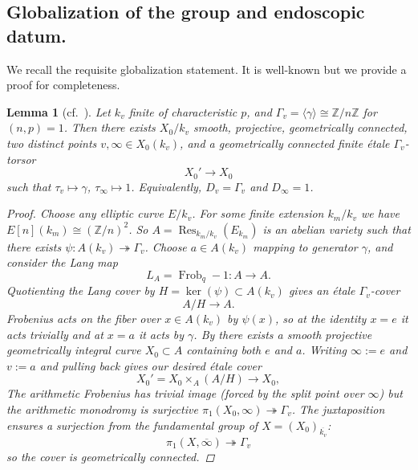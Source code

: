 \documentclass[openany]{amsbook}
\newtheorem{lemma}[theorem]{Lemma}
\theoremstyle{definition}
\theoremstyle{remark}
\numberwithin{equation}{section}
\newcommand{\Z}{\mathbb{Z}}
\newcommand{\ol}[1]{\overline{#1}}
\renewcommand{\-}{\operatorname{-}}
\newcommand{\on}[1]{\operatorname{#1}}
\newcommand{\Res}{\on{Res}}
\begin{document}
\subsection{Globalization of the group and endoscopic datum.}
We recall the requisite globalization statement. It is well-known but we provide a proof for completeness.
\begin{lemma}[{cf.\ \cite[\S 8.6]{ngofl}}]\label{lem.globalize.group}
    Let $k_v$ finite of characteristic $p$, and $\Gamma_v = \langle \gamma \rangle \cong \Z/n\Z$ for $(n, p) = 1$. Then there exists $X_0/k_v$ smooth, projective, geometrically connected, two distinct points $v, \infty \in X_0(k_v)$, and a geometrically connected finite \'etale $\Gamma_v$-torsor
    $$
        X_0' \to X_0
    $$
    such that $\tau_v \mapsto \gamma$, $\tau_\infty \mapsto 1$. Equivalently, $D_v = \Gamma_v$ and $D_\infty = 1$.
    \begin{proof}
        Choose any elliptic curve $E/k_v$. For some finite extension $k_m/k_v$ we have $E[n](k_m) \cong (\Z/n)^2$. So $A = \Res_{k_m/k_v}(E_{k_m})$ is an abelian variety such that there exists $\psi : A(k_v) \twoheadrightarrow \Gamma_v$. Choose $a \in A(k_v)$ mapping to generator $\gamma$, and consider the Lang map
        $$
            L_A = \on{Frob}_q - 1 : A \to A.
        $$
        Quotienting the Lang cover by $H = \ker(\psi) \subset A(k_v)$ gives an \'etale $\Gamma_v$-cover 
        $$
            A/H \to A.
        $$
        Frobenius acts on the fiber over $x \in A(k_v)$ by $\psi(x)$, so at the identity $x = e$ it acts trivially and at $x = a$ it acts by $\gamma$. By \cite[Corollary 3.4]{poonenbertini} there exists a smooth projective geometrically integral curve $X_0 \subset A$ containing both $e$ and $a$. Writing $\infty := e$ and $v := a$ and pulling back gives our desired \'etale cover
        $$
            X_0' = X_0 \times_A (A/H) \to X_0,
        $$
        The arithmetic Frobenius has trivial image (forced by the split point over $\infty$) but the arithmetic monodromy is surjective $\pi_1(X_0, \infty) \twoheadrightarrow \Gamma_v$. The juxtaposition ensures a surjection from the fundamental group of $X = (X_0)_{\ol{k_v}}$:
        $$
            \pi_1(X, \ol{\infty}) \twoheadrightarrow \Gamma_v
        $$
        so the cover is geometrically connected.
    \end{proof}
\end{lemma}
\end{document}
